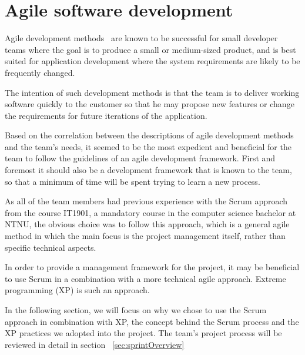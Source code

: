 \section{Agile software development}

Agile development methods~\cite{scrum} are known to be successful for small developer teams where the goal is to produce a small or medium-sized product, and is best suited for application development where the system requirements are likely to be frequently changed.

The intention of such development methods is that the team is to deliver working software quickly to the customer so that he may propose new features or change the requirements for future iterations of the application.

Based on the correlation between the descriptions of agile development methods and the team's needs, it seemed to be the most expedient and beneficial for the team to follow the guidelines of an agile development framework. First and foremost it should also be a development framework that is known to the team, so that a minimum of time will be spent trying to learn a new process.

As all of the team members had previous experience with the Scrum approach from the course IT1901, a mandatory course in the computer science bachelor at NTNU, the obvious choice was to follow this approach, which is a general agile method in which the main focus is the project management itself, rather than specific technical aspects.

In order to provide a management framework for the project, it may be beneficial to use Scrum in a combination with a more technical agile approach. Extreme programming (XP) is such an approach.

In the following section, we will focus on why we chose to use the Scrum approach in combination with XP, the concept behind the Scrum process and the XP practices we adopted into the project. The team's project process will be reviewed in detail in section ~\ref{sec:sprintOverview}